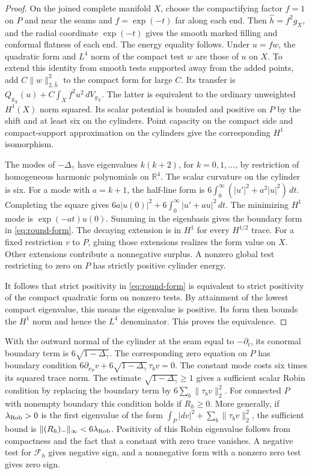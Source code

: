 \documentclass[11pt,letterpaper]{article}
\numberwithin{equation}{section}
\theoremstyle{remark}
\begin{document}
\begin{proof}
On the joined complete manifold \(X\), choose the compactifying
factor \(f=1\) on \(P\) and near the seams and \(f=\exp(-t)\)
far along each end. Then \(\widehat h=f^2g_X\), and the radial
coordinate \(\exp(-t)\) gives the smooth marked filling and
conformal flatness of each end. The energy equality follows.
Under \(u=fw\), the quadratic form and \(L^4\) norm of the
compact test \(w\) are those of \(u\) on \(X\). To extend this
identity from smooth tests supported away from the added points,
add \(C\|w\|_{2,\widehat h}^2\) to the compact form for large \(C\).
Its transfer is \(Q_{g_X}(u)+C\int_X f^2u^2\,dV_{g_X}\).
The latter is equivalent to the ordinary unweighted \(H^1(X)\)
norm squared. Its scalar potential is bounded and positive on
\(P\) by the shift and at least six on the cylinders. Point
capacity on the compact side and compact-support approximation
on the cylinders give the corresponding \(H^1\) isomorphism.

The modes of \(-\Delta_\gamma\) have eigenvalues \(k(k+2)\),
for \(k=0,1,\ldots\), by restriction of homogeneous harmonic
polynomials on \(\mathbb R^4\). The scalar curvature on the
cylinder is six. For a mode with \(a=k+1\), the half-line form
is \(6\int_0^\infty(|u'|^2+a^2|u|^2)\,dt\). Completing the
square gives \(6a|u(0)|^2+6\int_0^\infty|u'+au|^2\,dt\).
The minimizing \(H^1\) mode is \(\exp(-at)u(0)\).
Summing in the eigenbasis gives the boundary form in
\eqref{eq:round-form}. The decaying extension is in \(H^1\)
for every \(H^{1/2}\) trace. For a fixed restriction \(v\) to
\(P\), gluing those extensions realizes the form value on \(X\).
Other extensions contribute a nonnegative surplus. A nonzero
global test restricting to zero on \(P\) has strictly positive
cylinder energy.

It follows that strict positivity in \eqref{eq:round-form}
is equivalent to strict positivity of the compact quadratic
form on nonzero tests. By attainment of the lowest compact
eigenvalue, this means the eigenvalue is positive. Its form
then bounds the \(H^1\) norm and hence the \(L^4\) denominator.
This proves the equivalence.
\end{proof}

With the outward normal of the cylinder at the seam equal to
\(-\partial_t\), its conormal boundary term is
\(6\sqrt{1-\Delta_\gamma}\). The corresponding zero equation
on \(P\) has boundary condition
\(6\partial_{\nu_P}v+6\sqrt{1-\Delta_\gamma}\,\tau_bv=0\).
The constant mode costs six times its squared trace norm.
The estimate \(\sqrt{1-\Delta_\gamma}\ge1\) gives a sufficient
scalar Robin condition by replacing the boundary term by
\(6\sum_b\|\tau_bv\|_2^2\). For connected \(P\) with nonempty
boundary this condition holds if \(R_h\ge0\). More generally,
if \(\lambda_{\rm Rob}>0\) is the first eigenvalue of the form
\(\int_P|dv|^2+\sum_b\|\tau_bv\|_2^2\), the sufficient bound is
\(\|(R_h)_-\|_\infty<6\lambda_{\rm Rob}\). Positivity of this
Robin eigenvalue follows from compactness and the fact that a
constant with zero trace vanishes. A negative test for
\(\mathcal F_h\) gives negative sign, and a nonnegative form
with a nonzero zero test gives zero sign.
\end{document}
